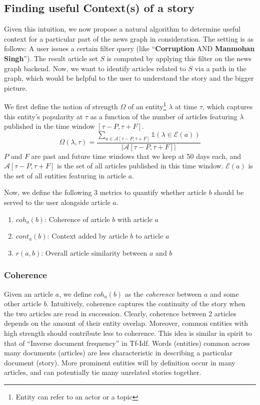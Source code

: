 \subsection{Finding useful Context(s) of a story}
\label{sec:finding-context}
Given this intuition, we now propose a natural algorithm to determine useful context for a particular part of
the news graph in consideration. The setting is as follows: A user issues a certain filter query (like ``{\bf Corruption} AND {\bf Manmohan Singh}''). The result article set $S$ is computed by applying this filter on the news graph backend. Now, we want to identify articles
related to $S$ via a path in the graph, which would be helpful to the user to understand the story and the bigger picture.

We first define the notion of strength $\Omega$ of an entity\footnote{Entity can refer to an actor or a topic} $\lambda$ at time $\tau$, which captures this entity's popularity at $\tau$ as a function of the number of articles featuring $\lambda$ published in the time window $[\tau - P, \tau + F]$.
\begin{equation}
\Omega(\lambda, \tau) = \frac{\sum_{a \in \mathcal{A}[\tau - P, \tau + F]}{\mathbb{1}(\lambda \in \mathcal{E}(a))}}{|\mathcal{A}[\tau - P, \tau + F]|}
\end{equation}
$P$ and $F$ are past and future time windows that we keep at 50 days each, and $\mathcal{A}[\tau - P, \tau + F]$ is the set of all articles published in this time window. $\mathcal{E}(a)$ is the set of all entities featuring in article $a$.

Now, we define the following 3 metrics to quantify whether article $b$ should be served to the user alongside article $a$.
\begin{enumerate}
\item $coh_a(b)$: Coherence of article $b$ with article $a$
\item $cont_a(b)$: Context added by article $b$ to article $a$ 
\item $r(a, b)$: Overall article similarity between $a$ and $b$
\end{enumerate}

\subsubsection*{Coherence}
Given an article $a$, we define $coh_{a}(b)$ as the \emph{coherence} between $a$ and some other article $b$. Intuitively, coherence captures the continuity of the story when the two articles are read in succession.
Clearly, coherence between 2 articles depends on the amount of their entity overlap. Moreover, common entities with high strength should contribute less to coherence. This idea is similar in spirit to that of ``Inverse document frequency'' in Tf-Idf. Words (entities) common across many documents (articles) are less characteristic in describing a particular document (story). 
More prominent entities will by definition occur in many articles, and can potentially tie many unrelated stories together. 

